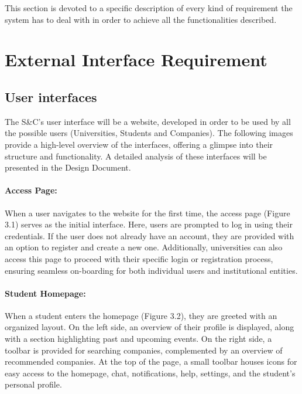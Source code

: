 This section is devoted to a specific description of every kind of requirement the system has to deal with in order to achieve all the functionalities described.


\section{External Interface Requirement}
\label{sec:external_interface_requirements}%


\subsection{User interfaces}
\label{subsec:User_interfaces}%


The S\&C's user interface will be a website, developed in order to be used by all the possible users (Universities, Students and Companies).
The following images provide a high-level overview of the interfaces, offering a glimpse into their structure and functionality. A detailed analysis of these interfaces will be presented in the Design Document.


\paragraph{Access Page:} When a user navigates to the website for the first time, the access page (Figure 3.1) serves as the initial interface. Here, users are prompted to log in using their credentials. If the user does not already have an account, they are provided with an option to register and create a new one. Additionally, universities can also access this page to proceed with their specific login or registration process, ensuring seamless on-boarding for both individual users and institutional entities.


\paragraph{Student Homepage:} When a student enters the homepage (Figure 3.2), they are greeted with an organized layout. On the left side, an overview of their profile is displayed, along with a section highlighting past and upcoming events. On the right side, a toolbar is provided for searching companies, complemented by an overview of recommended companies. At the top of the page, a small toolbar houses icons for easy access to the homepage, chat, notifications, help, settings, and the student’s personal profile.

\newpage

